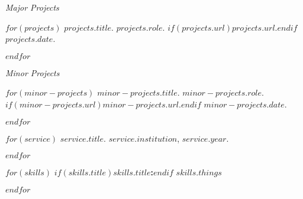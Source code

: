 \documentclass[11pt,article,oneside]{memoir}
\begin{document}
\bigskip
\pagebreak[1]


\ind \emph{Major Projects}

\smallskip

$for(projects)$
\ind \emph{$projects.title$}. $projects.role$. $if(projects.url)$\href{$projects.url$}{$projects.url$}.$endif$ $projects.date$.

\smallskip
$endfor$

\bigskip

\ind \emph{Minor Projects}

\smallskip

$for(minor-projects)$
\ind \emph{$minor-projects.title$}. $minor-projects.role$. $if(minor-projects.url)$\href{$minor-projects.url$}{$minor-projects.url$}.$endif$ $minor-projects.date$.

\smallskip
$endfor$

\bigskip
\pagebreak[1]


%
%
%
%
%
%

$for(service)$
\ind $service.title$. $service.institution$, $service.year$.

\smallskip
\pagebreak[1]
$endfor$

\bigskip


$for(skills)$
\ind$if(skills.title)$\textbf{$skills.title$:}$endif$ $skills.things$

\smallskip
\pagebreak[1]
$endfor$

\bigskip

\thispagestyle{jtmcolophon}
\end{document}
